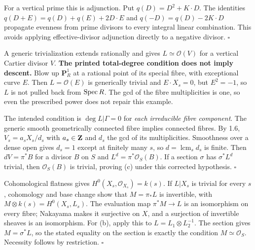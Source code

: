 \documentclass[11pt]{article}
\let\chapterexercise\exercise
\renewcommand{\exercise}[2]{\Needspace{8\baselineskip}\chapterexercise{#1}{#2}}
\begin{document}
\pf For a vertical prime this is adjunction. Put $q(D)=D^2+K\cdot D$. The identities $q(D+E)=q(D)+q(E)+2D\cdot E$ and $q(-D)=q(D)-2K\cdot D$ propagate evenness from prime divisors to every integral linear combination. This avoids applying effective-divisor adjunction directly to a negative divisor. \hfill$\square$

\pf A generic trivialization extends rationally and gives $L\simeq\mathcal O(V)$ for a vertical Cartier divisor $V$. \textbf{The printed total-degree condition does not imply descent.} Blow up $\mathbf P^1_R$ at a rational point of its special fibre, with exceptional curve $E$. Then $L=\mathcal O(E)$ is generically trivial and $E\cdot X_s=0$, but $E^2=-1$, so $L$ is not pulled back from $\operatorname{Spec} R$. The gcd of the fibre multiplicities is one, so even the prescribed power does not repair this example.

The intended condition is $\deg L|\Gamma=0$ for \emph{each irreducible fibre component}. The generic smooth geometrically connected fibre implies connected fibres. By 1.6, $V_s=a_sX_s/d_s$ with $a_s\in\mathbf Z$ and $d_s$ the gcd of its multiplicities. Smoothness over a dense open gives $d_s=1$ except at finitely many $s$, so $d=\operatorname{lcm}_s d_s$ is finite. Then $dV=\pi^*B$ for a divisor $B$ on $S$ and $L^d=\pi^*\mathcal O_S(B)$. If a section $\sigma$ has $\sigma^*L^d$ trivial, then $\mathcal O_S(B)$ is trivial, proving (c) under this corrected hypothesis. \hfill$\square$

\pf Cohomological flatness gives $H^0(X_s,\mathcal O_{X_s})=k(s)$. If $L|X_s$ is trivial for every $s$, cohomology and base change show that $M=\pi_*L$ is invertible, with $M\otimes k(s)=H^0(X_s,L_s)$. The evaluation map $\pi^*M\to L$ is an isomorphism on every fibre; Nakayama makes it surjective on $X$, and a surjection of invertible sheaves is an isomorphism. For (b), apply this to $L=L_1\otimes L_2^{-1}$. The section gives $M=\sigma^*L$, so the stated equality on the section is exactly the condition $M\simeq\mathcal O_S$. Necessity follows by restriction. \hfill$\square$
\end{document}
